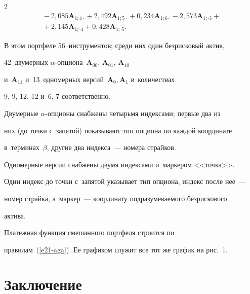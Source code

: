 \begin{multicols}{2}
\begin{multline*}
{}-


2{,}085\bm{A}_{1;4\cdot} + 2{,}492\bm{A}_{1;5\cdot} + 0{,}234\bm{A}_{1;6\cdot} - 


2{,}573\bm{A}_{1;\cdot 3} +{}\\


{}+ 2{,}145\bm{A}_{1;\cdot 4} + 0{,}428\bm{A}_{1;\cdot 5}. 


  \end{multline*}


  


  \vspace*{-2pt}


  


\noindent


  В этом портфеле 56~инструментов; среди них один безрисковый актив, 


42~двумерных $\alpha$-оп\-ци\-она~$\bm{A}_{00}$, $\bm{A}_{01}$, $\bm{A}_{10}$ 


и~$\bm{A}_{11}$ и~13~одномерных версий~$\bm{A}_0, \bm{A}_1$ в~количествах 


9, 9, 12, 12 и~6, 7 соответственно. 


  


  Двумерные $\alpha$-оп\-ци\-оны снабжены четырьмя индексами; первые два из 


них (до точки с~запятой) показывают тип опциона по каждой координате 


в~терминах~$\beta$, другие два индекса~--- номера страй\-ков. 


  


  Одномерные версии снабжены двумя индексами и~маркером <<точка>>. 


Один индекс до точки с~запятой указывает тип опциона, индекс после нее~---  


номер страй\-ка, а~маркер~--- координату под\-ра\-зу\-ме\-ва\-емо\-го безрискового 


актива.


  


  Платежная функция смешанного портфеля строится по  


правилам~(\ref{e21-aga}). Ее графиком служит все тот же график на рис.~1. 


  


  \section{Заключение }



\end{multicols}
